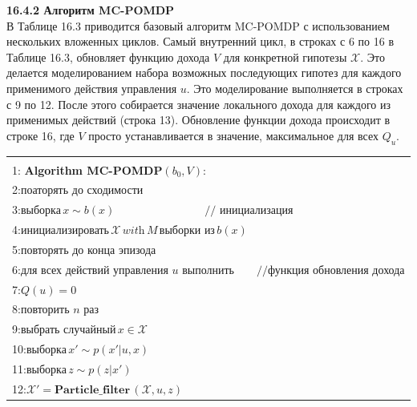 \documentclass[10pt,a4paper]{article}
\begin{document}
\textbf{16.4.2	Алгоритм MC-POMDP} \\

В Таблице 16.3 приводится базовый алгоритм MC-POMDP с использованием нескольких вложенных циклов.  Самый внутренний цикл, в строках с  6 по 16 в Таблице 16.3, обновляет функцию дохода $V$ для конкретной гипотезы $\mathcal{X}$. Это делается моделированием набора возможных последующих гипотез для каждого применимого действия управления $u$. Это моделирование выполняется в строках с 9 по 12. После этого собирается значение локального дохода для каждого из применимых действий (строка 13). Обновление функции дохода происходит в строке 16, где $V$ просто устанавливается в значение, максимальное для всех $Q_u$.\\

\begin{table}[H]
\begin{center}
\begin{tabular}{|l|}
\hline
{}\\
1:\textbf{ Algorithm MC-POMDP}$(b_0,V):$\\
2:\hspace{5mm}$\textit{поаторять до сходимости}$\\
3:\hspace{10mm}$\textit{выборка}\,x\sim b(x)\qquad\qquad\qquad\qquad//\text{ инициализация}$\\
4:\hspace{10mm}$\textit{инициализировать}\,\mathcal{X}\,\textit{with}\,M\,\textit{выборки из}\,b(x)$\\
5:\hspace{10mm}$\textit{повторять до конца эпизода}$\\
6:\hspace{15mm}$\textit{для всех действий управления u выполнить}\qquad//\text{функция обновления дохода}$\\
7:\hspace{20mm}$Q(u)=0$\\
8:\hspace{20mm}$\textit{повторить n раз}$\\
9:\hspace{25mm}$\textit{выбрать случайный}\,x\in\mathcal{X}$\\
10:\hspace{24mm}$\textit{выборка}\,x'\sim p(x'|u,x)$\\
11:\hspace{24mm}$\textit{выборка}\,z\sim p(z|x')$\\
12:\hspace{24mm}$\mathcal{X}'=\textbf{Particle\_filter}\,(\mathcal{X},u,z)$\\

\end{tabular}
\end{center}
\end{table}
\end{document}

